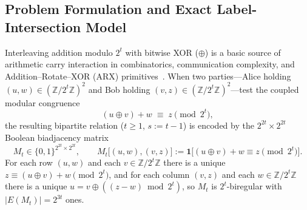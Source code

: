 \documentclass[11pt,reqno]{amsart}
\theoremstyle{definition}
\theoremstyle{remark}
\newcommand{\ZZ}{\mathbb{Z}}
\newcommand{\ind}{\mathbf{1}}
\numberwithin{equation}{section}
\begin{document}
\subsection{Problem Formulation and Exact Label-Intersection Model}
Interleaving addition modulo $2^t$ with bitwise XOR ($\oplus$) is a basic source of arithmetic carry interaction in combinatorics, communication complexity, and Addition--Rotate--XOR (ARX) primitives~\cite{LM01,Wal03,LWD04,MVDP10}. When two parties---Alice holding $(u, w) \in (\ZZ/2^t\ZZ)^2$ and Bob holding $(v, z) \in (\ZZ/2^t\ZZ)^2$---test the coupled modular congruence
\begin{equation}
  \label{eq:arx-cong}
  (u \oplus v) + w \;\equiv\; z \pmod{2^t},
\end{equation}
the resulting bipartite relation ($t \ge 1$, $s := t - 1$) is encoded by the $2^{2t} \times 2^{2t}$ Boolean biadjacency matrix
\begin{equation}
  \label{eq:Mt-def}
  M_t \in \{0, 1\}^{2^{2t} \times 2^{2t}}, \qquad M_t\bigl[(u, w), (v, z)\bigr] := \ind\bigl[(u \oplus v) + w \equiv z \pmod{2^t}\bigr].
\end{equation}
For each row $(u, w)$ and each $v \in \ZZ/2^t\ZZ$ there is a unique $z \equiv (u \oplus v) + w \pmod{2^t}$, and for each column $(v, z)$ and each $w \in \ZZ/2^t\ZZ$ there is a unique $u = v \oplus ((z - w) \bmod 2^t)$, so $M_t$ is $2^t$-biregular with $|E(M_t)| = 2^{3t}$ ones.
\end{document}
